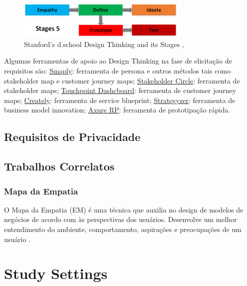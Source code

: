 \documentclass[conference]{IEEEtran}
\begin{document}
\begin{figure}
    \centering
    \includegraphics[width=3.2in]{Figures/5Stages.png}
    \caption{Stanford’s d.school Design Thinking and its Stages \cite{DBLP:conf/hci/XimenesAA15},\cite{ DBLP:conf/icse/CarrollR16}}
    \label{fig:my_label}
\end{figure}

Algumas ferramentas de apoio ao Design Thinking na fase de elicitação de requisitos são: \href{http://www.smaply.com}{Smaply}: ferramenta de persona e outros métodos tais como stakeholder map e customer journey maps; \href{http://www.stakeholder-management.com/}{Stakeholder Circle}: ferramenta de stakeholder maps; \href{http://www.touchpointdashboard.com}{Touchpoint  Dashcboard}: ferramenta de customer journey maps; \href{http://www.creately.com}{Creately}: ferramenta de service blueprint; \href{http://www.strategyzer.com}{Strategyzer}: ferramenta de business model innovation; \href{http://
www.axure.com/}{Axure RP}: ferramenta de prototipação rápida.

\subsection{Requisitos de Privacidade}
\cite{DBLP:conf/wer/2019}



\subsection{Trabalhos Correlatos}

\subsubsection{Mapa da Empatia}

O Mapa da Empatia (EM) é uma técnica que auxilia no design de modelos de negócios de acordo com às perspectivas dos usuários. Desenvolve um
melhor entendimento do ambiente, comportamento, aspirações e preocupações de um usuário \cite{DBLP:conf/hci/FerreiraBC16}.


\section{Study Settings}
\label{method}
\end{document}
